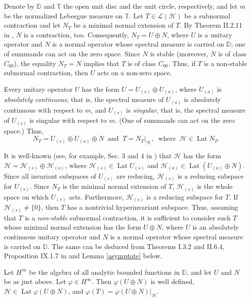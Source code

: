 \documentclass[a4paper,oneside,11pt]{amsart}
\numberwithin{equation}{section}
\theoremstyle{plain}
\theoremstyle{definition}
\begin{document}
Denote by $\mathbb D$ and  $\mathbb T$ the open unit disc and the unit circle, respectively, 
and let $m$ be the normalized Lebesgue measure on $\mathbb T$. 
Let $T\in\mathcal L(\mathcal H)$ be a subnormal contraction and let $N_T$ be a minimal normal extension of $T$. By Theorem II.2.11 in
 \cite{conwaysubnormal}, $N$ is a contraction, too. Consequently, $N_T=U\oplus N$, where $U$ is a unitary operator and $N$ is a normal operator whose spectral measure is carried on $\mathbb D$; one of summands can act on the zero space. 
Since $N$ is  stable (moreover, $N$ is of class $C_{00}$),  the equality $N_T=N$ implies that $T$ 
 is of class $C_{00}$. Thus, if $T$ is a non-stable subnormal contraction, then  $U$ acts on a non-zero space. 

Every unitary operator $U$ has the form $U=U_{(s)}\oplus U_{(a)}$, where $U_{(a)}$ is \emph{absolutely continuous}, that is,  the spectral measure of $U_{(a)}$ is absolutely continuous with respect to $m$, and $ U_{(s)}$
is \emph{singular}, that is,  the spectral measure of $U_{(s)}$ is singular   with respect to $m$. (One of summands can act on the zero space.) Thus, 
\begin{equation*}  N_T=U_{(s)}\oplus U_{(a)}\oplus N \ \text{ and }\ T=N_T|_{\mathcal H}, 
\ \text{ where }\ \mathcal H\in\operatorname{Lat}N_T. 
\end{equation*}

It is well-known (see, for example, Sec. 3 and 4 in \cite{k16})
that 
$ \mathcal H$ has the form $ \mathcal  H=\mathcal H_{(s)}\oplus\mathcal H_{(a)}$, 
where $\mathcal H_{(s)}\in\operatorname{Lat} U_{(s)}$ and $\mathcal H_{(a)}\in\operatorname{Lat}(U_{(a)}\oplus N)$. 
Since all invariant subspaces of $ U_{(s)}$ are reducing,  $ \mathcal H_{(s)}$ is a reducing subspace for $U_{(s)}$. 
 Since $N_T$ is the minimal normal extension of $T$,   $ \mathcal H_{(s)}$ is the whole space on which  $U_{(s)}$ acts. Furthermore,  $ \mathcal H_{(s)}$ is a reducing subspace 
for $T$.  If  $ \mathcal H_{(s)}\neq\{0\}$, then $T$ has a nontrivial hyperinvariant subspace. 
Thus, assuming that $T$ is a \emph{non-stable} subnormal contraction,  it is sufficient to consider such $T$ whose minimal normal extension has the form $U\oplus N$, where $U$ is an absolutely continuous unitary operator and $N$ is  a normal operator whose spectral measure is carried on $\mathbb D$. The same can be deduced from Theorems I.3.2 and II.6.4, Proposition IX.1.7 in \cite{sznfbk} and Lemma \ref{asymptote} below. 

Let $H^\infty$ be the algebra of all analytic bounded functions in $\mathbb D$, and let $U$ and $N$ be as just above. 
 Let $\varphi\in H^\infty$. Then $\varphi(U\oplus N)$ is well defined, 
 $\mathcal H\in \operatorname{Lat}\varphi( U\oplus N)$, and 
$\varphi(T)=\varphi(U\oplus N)|_{\mathcal H}$. 
\end{document}
